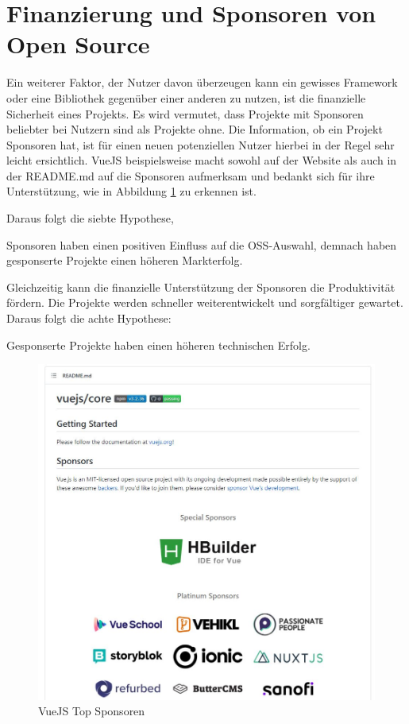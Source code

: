 \section{Finanzierung und Sponsoren von Open Source}\label{sec:sponsors}

Ein weiterer Faktor, der Nutzer davon überzeugen kann ein gewisses Framework oder eine Bibliothek 
gegenüber einer anderen zu nutzen, ist die finanzielle Sicherheit eines Projekts. Es wird vermutet,
dass Projekte mit Sponsoren beliebter bei Nutzern sind als Projekte ohne.
Die Information, ob ein Projekt Sponsoren hat, ist für einen neuen potenziellen Nutzer hierbei in der
Regel sehr leicht ersichtlich. 
VueJS beispielsweise macht sowohl auf der Website als auch in der README.md auf die Sponsoren aufmerksam
und bedankt sich für ihre Unterstützung, wie in Abbildung \ref{abb:VueJS_Sponsors} zu erkennen ist.

Daraus folgt die siebte Hypothese,

\begin{hypothesis}
    Sponsoren haben einen positiven Einfluss auf die OSS-Auswahl, demnach haben gesponserte Projekte
    einen höheren Markterfolg.
    \label{H:7}
\end{hypothesis}

\noindent
Gleichzeitig kann die finanzielle Unterstützung der Sponsoren die Produktivität fördern.
Die Projekte werden schneller weiterentwickelt und sorgfältiger gewartet. Daraus folgt die 
achte Hypothese:

\begin{hypothesis}
    Gesponserte Projekte haben einen höheren technischen Erfolg.
    \label{H:8}
\end{hypothesis}

\begin{figure}[h]
    \centering
    \includegraphics[scale=0.6]{figures/02/VueSponsoren.JPG}
    \caption{VueJS Top Sponsoren}
    \label{abb:VueJS_Sponsors}
\end{figure}
